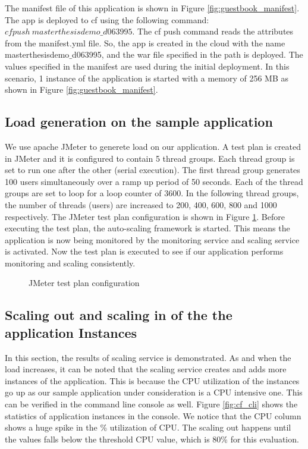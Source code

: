 \documentclass[article,type=msc,colorback,12pt,accentcolor=tud8b,table]{tudthesis}
\begin{document}
The manifest file of this application is shown in Figure \ref{fig:guestbook_manifest}. The app is deployed to \gls{cf} using the following command: $ cf push \: masterthesisdemo\_d063995 $. The cf push command reads the attributes from the manifest.yml file. So, the app is created in the cloud with the name masterthesisdemo$\_$d063995, and the war file specified in the path is deployed. The values specified in the manifest are used during the initial deployment. In this scenario, 1 instance of the application is started with a memory of 256 MB as shown in Figure \ref{fig:guestbook_manifest}.	
	
	\subsection{Load generation on the sample application}
	
 We use apache JMeter to generete load on our application. A test plan is created in JMeter and it is configured to contain 5 thread groups. Each thread group is set to run one after the other (serial execution). The first thread group generates 100 users simultaneously over a ramp up period of 50 seconds. Each of the thread groups are set to loop for a loop counter of 3600. In the following thread groups, the number of threads (users) are increased to 200, 400, 600, 800 and 1000 respectively. The JMeter test plan configuration is shown in Figure \ref{fig:jmeter_testplan}. Before executing the test plan, the auto-scaling framework is started. This means the application is now being monitored by the monitoring service and scaling service is activated. Now the test plan is executed to see if our application performs monitoring and scaling consistently.
 
  \begin{figure}[h]
  	\begin{center}
  		\makebox[\textwidth]{\texttt{[image: E3]}}
  	\end{center}
  	\caption{JMeter test plan configuration}
  	\label{fig:jmeter_testplan}
  \end{figure}
	
	\subsection{Scaling out and scaling in of the the application Instances}
		
	In this section, the results of scaling service is demonstrated. As and when the load increases, it can be noted that the scaling service creates and adds more instances of the application. This is because the CPU utilization of the instances go up as our sample application under consideration is a CPU intensive one. This can be verified in the command line console as well. Figure \ref{fig:cf_cli} shows the statistics of application instances in the console. We notice that the CPU column shows a huge spike in the \% utilization of CPU. The scaling out happens until the values falls below the threshold CPU value, which is 80\% for this evaluation.
	
\end{document}
